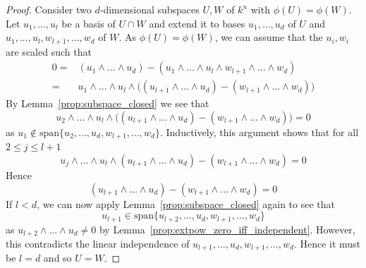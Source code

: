 \documentclass{scrartcl}
\newcommand{\vspan}{\mathrm{span}}
\theoremstyle{definition}
\begin{document}
\begin{proof}
    Consider two $d$-dimensional subspaces $U, W$ of $k^n$ with $\phi(U) = \phi(W)$.
    Let $u_1, ..., u_l$ be a basis of $U \cap W$ and extend it to bases $u_1, ..., u_d$ of $U$ and $u_1, ..., u_l, w_{l + 1}, ..., w_d$ of $W$.
    As $\phi(U) = \phi(W)$, we can assume that the $u_i, w_i$ are scaled such that
    \begin{align*}
        0 =& (u_1 \wedge ... \wedge u_d) - (u_1 \wedge ... \wedge u_l \wedge w_{l + 1} \wedge ... \wedge w_d) \\
        =& u_1 \wedge ... \wedge u_l \wedge \bigl( (u_{l + 1} \wedge ... \wedge u_d) - (w_{l + 1} \wedge ... \wedge w_d) \bigr)
    \end{align*}
    By Lemma~\ref{prop:subspace_closed} we see that
    \begin{equation*}
        u_2 \wedge ... \wedge u_l \wedge \bigl( (u_{l + 1} \wedge ... \wedge u_d) - (w_{l + 1} \wedge ... \wedge w_d) \bigr) = 0
    \end{equation*}
    as $u_1 \notin \vspan\{u_2, ..., u_d, w_{l + 1}, ..., w_d\}$.
    Inductively, this argument shows that for all $2 \leq j \leq l + 1$
    \begin{equation*}
        u_j \wedge ... \wedge u_l \wedge (u_{l + 1} \wedge ... \wedge u_d) - (w_{l + 1} \wedge ... \wedge w_d) = 0
    \end{equation*}
    Hence
    \begin{equation*}
        (u_{l + 1} \wedge ... \wedge u_d) - (w_{l + 1} \wedge ... \wedge w_d) = 0
    \end{equation*}
    If $l < d$, we can now apply Lemma~\ref{prop:subspace_closed} again to see that
    \begin{equation*}
        u_{l + 1} \in \vspan\{ u_{l + 2}, ..., u_d, w_{l + 1}, ..., w_d \}
    \end{equation*}
    as $u_{l + 2} \wedge ... \wedge u_d \neq 0$ by Lemma~\ref{prop:extpow_zero_iff_independent}.
    However, this contradicts the linear independence of $u_{l + 1}, ..., u_d, w_{l + 1}, ..., w_d$.
    Hence it must be $l = d$ and so $U = W$.
\end{proof}
\end{document}
